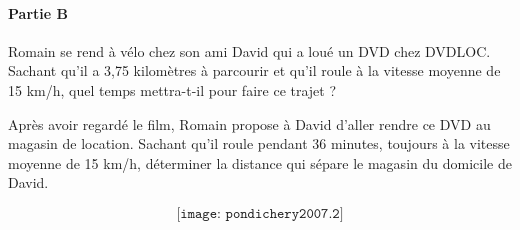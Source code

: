 \paragraph{Partie B}\hfill\newline
\begin{myenumerate}
\item Romain se rend à vélo chez son ami David qui a loué un DVD chez DVDLOC.\\
Sachant qu'il a 3,75 kilomètres à parcourir et qu'il roule à la vitesse moyenne de 15 km/h, quel temps mettra-t-il pour faire ce trajet ?
\item Après avoir regardé le film, Romain propose à David d'aller rendre ce DVD au magasin de location. Sachant qu'il roule pendant 36 minutes, toujours à la vitesse moyenne de 15 km/h, déterminer la distance qui sépare le magasin du domicile de David.
\end{myenumerate}
\[\texttt{[image: pondichery2007.2]}\]